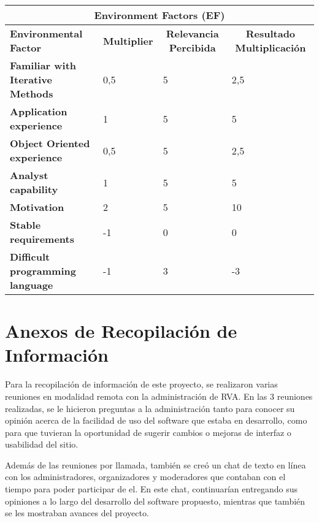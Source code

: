 \begin{center}
  \begin{tabular}{ | p{4cm} | p{2cm} | p{4cm}| p{5cm} | } 
    \hline
    \multicolumn{4}{|c|}{\textbf{Environment Factors (EF)}} \\
    \hline
    \multicolumn{1}{|p{3cm}|}{\textbf{Environmental Factor}} & \multicolumn{1}{|c|}{\textbf{Multiplier}} & \multicolumn{1}{|c|}{\textbf{Relevancia Percibida}} & \multicolumn{1}{|c|}{\textbf{Resultado Multiplicación}} \\
    \hline
    
    {\textbf{Familiar with Iterative Methods}} & 0,5 & 5 & 2,5 \\ \hline
    {\textbf{Application experience}} & 1 & 5 & 5 \\ \hline
    {\textbf{Object Oriented experience}} & 0,5 & 5 & 2,5 \\ \hline
    {\textbf{Analyst capability}} & 1 & 5 & 5 \\ \hline
    {\textbf{Motivation}} & 2 & 5 & 10 \\ \hline
    {\textbf{Stable requirements}} & -1 & 0 & 0 \\ \hline
    {\textbf{Difficult programming language}} & -1 & 3 & -3 \\ \hline
  \end{tabular}
  
    \label{table:ef}
\end{center}

\section{Anexos de Recopilación de Información}
Para la recopilación de información de este proyecto, se realizaron varias reuniones en modalidad remota con la administración de RVA. En las 3 reuniones realizadas, se le hicieron preguntas a la administración tanto para conocer su opinión acerca de la facilidad de uso del software que estaba en desarrollo, como para que tuvieran la oportunidad de sugerir cambios o mejoras de interfaz o usabilidad del sitio.

Además de las reuniones por llamada, también se creó un chat de texto en línea con los administradores, organizadores y moderadores que contaban con el tiempo para poder participar de el. En este chat, continuarían entregando sus opiniones a lo largo del desarrollo del software propuesto, mientras que también se les mostraban avances del proyecto.

